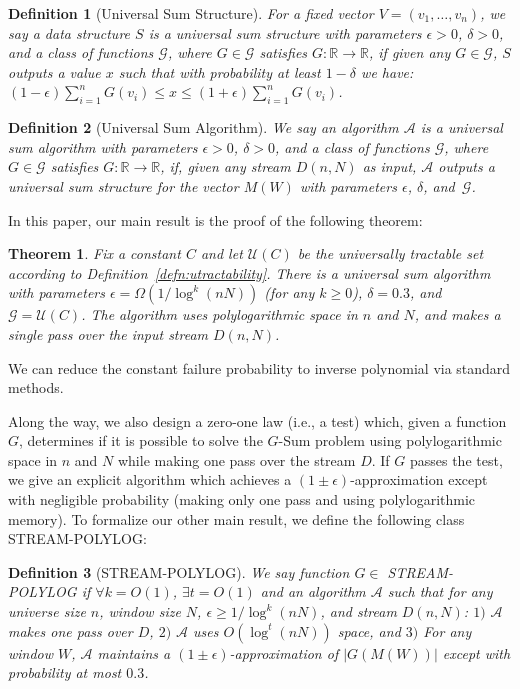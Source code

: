 \documentclass[11pt]{article}
\newtheorem{thm}{Theorem}
\newtheorem{defn}{Definition}
\begin{document}
\begin{defn}[Universal Sum Structure]\label{defn:uss}
For a fixed vector $V = (v_1,\ldots,v_n)$, we say a data structure $S$ is a universal sum structure with
parameters $\epsilon > 0$, $\delta > 0$, and a class of functions $\mathcal{G}$, where $G \in \mathcal{G}$
satisfies $G:\mathbb{R} \rightarrow \mathbb{R}$, if given any $G \in \mathcal{G}$, $S$ outputs a value $x$
such that with probability at least $1-\delta$ we have:
$(1-\epsilon)\sum_{i=1}^nG(v_i) \leq x \leq (1+\epsilon)\sum_{i=1}^nG(v_i)$.
\end{defn}

\begin{defn}[Universal Sum Algorithm]\label{defn:usa}
We say an algorithm $\mathcal{A}$ is a universal sum algorithm with parameters $\epsilon > 0$, $\delta > 0$,
and a class of functions $\mathcal{G}$, where $G \in \mathcal{G}$
satisfies $G:\mathbb{R} \rightarrow \mathbb{R}$, if, given any stream $D(n,N)$ as input,
$\mathcal{A}$ outputs a universal sum structure for the vector $M(W)$ with parameters $\epsilon$, $\delta$,
and~$\mathcal{G}$.
\end{defn}

In this paper, our main result is the proof of the following theorem:
\begin{thm}\label{thm:mainusum}
Fix a constant $C$ and let $\mathcal{U}(C)$ be the universally tractable set according to Definition~\ref{defn:utractability}.
There is a universal sum algorithm with parameters
$\epsilon = \Omega(1/\log^k(nN))$ (for any $k \geq 0$), $\delta = 0.3$,
and $\mathcal{G} = \mathcal{U}(C)$.  The algorithm uses polylogarithmic space in $n$ and $N$, and
makes a single pass over the input stream $D(n,N)$.
\end{thm}

\noindent We can reduce the constant failure probability to inverse polynomial via standard methods.

Along the way, we also design a zero-one law (i.e., a test) which, given a function $G$,
determines if it is possible to solve the $G$-Sum problem
using polylogarithmic space in $n$ and $N$ while making one pass over the stream $D$.  If
$G$ passes the test, we give an explicit algorithm which achieves a $(1 \pm \epsilon)$-approximation
except with negligible probability (making only one pass and using polylogarithmic memory).
To formalize our other main result, we define the following class {\sf STREAM-POLYLOG}:
\begin{defn}[{\sf STREAM-POLYLOG}]\label{def: strplg}
We say function $G \in$ {\sf STREAM-POLYLOG} if $\forall k = O(1)$, $\exists t=O(1)$ and
an algorithm $\mathcal{A}$ such that for any universe size $n$, window size $N$, $\epsilon \ge 1/\log^k(nN)$,
and stream $D(n,N)$:
$1)$ $\mathcal{A}$ makes one pass over $D$, $2)$ $\mathcal{A}$ uses $O(\log^{t}(nN))$ space, and $3)$
For any window $W$, $\mathcal{A}$ maintains a $(1 \pm \epsilon)$-approximation of $|G(M(W))|$
except with probability at most $0.3$.
\end{defn}
\end{document}
